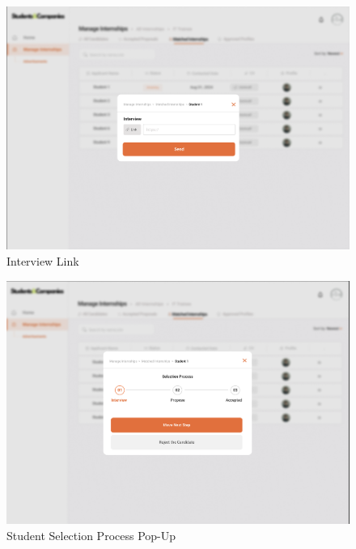 \documentclass[a4paper,12pt]{article}
\begin{document}
\begin{figure}[H]
    \centering
    \includegraphics[scale = 0.42]{figures/UserInterfaces/Company/InterviewLink.png}
    \caption{Interview Link}
     \centering
\end{figure}
\begin{figure}[H]
    \centering
    \includegraphics[scale = 0.42]{figures/UserInterfaces/Company/SelectionProcess.png}
    \caption{Student Selection Process Pop-Up}
     \centering
\end{figure}
\end{document}
